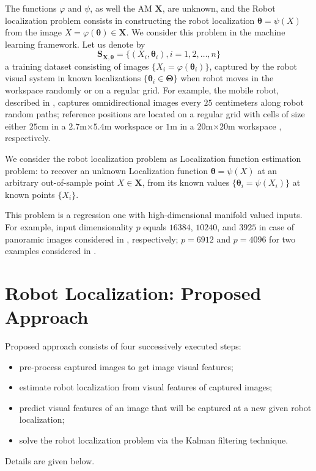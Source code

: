 \documentclass[conference]{IEEEtran} %
\def\mbTheta{{\bm\Theta}}
\def\mbtheta{{\bm\theta}}
\def\mbX{\mathbf{X}}
\def\mbS{\mathbf{S}}
\begin{document}
The functions $\varphi$ and $\psi$, as well the AM $\mbX$, are unknown, and the Robot localization problem consists in constructing the robot localization $\mbtheta = \psi(X)$ from the image $X = \varphi(\mbtheta) \in \mbX$. We consider this problem in the machine learning framework. Let us denote by
\begin{equation}
\label{eq3}
	\mbS_{\mathbf{X},\mbtheta} = \{(X_i,\mbtheta_i), i = 1, 2, \ldots, n\}
\end{equation}
a training dataset consisting of images $\{X_i = \varphi(\mbtheta_i)\}$, captured by the robot visual system in known localizations $\{\mbtheta_i \in \mbTheta\}$ when robot moves in the workspace randomly or on a regular grid. For example, the mobile robot, described in \cite{bib7}, captures omnidirectional images every $25$ centimeters along robot random paths; reference positions are located on a regular grid with cells of size either $25$cm in a $2.7$m$\times5.4$m workspace \cite{bib8} or $1$m in a $20$m$\times20$m workspace \cite{bib9}, respectively.

We consider the robot localization problem as Localization function estimation problem: to recover an unknown Localization function $\mbtheta = \psi(X)$ at an arbitrary out-of-sample point $X \in \mbX$, from its known values $\{\mbtheta_i = \psi(X_i)\}$ at known points $\{X_i\}$.

This problem is a regression one with high-dimensional manifold valued inputs. For example, input dimensionality $p$ equals $16384$, $10240$, and $3925$ in case of panoramic images considered in \cite{bib7,bib8,bib9}, respectively; $p = 6912$ and $p = 4096$ for two examples considered in \cite{bib10}.

\section{Robot Localization: Proposed Approach}
\label{sec3}

Proposed approach consists of four successively executed steps:
\begin{itemize}
	\item
    	pre-process captured images to get image visual features;
     \item
     	estimate robot localization from visual features of captured images;
     \item
     	predict visual features of an image that will be captured at a new given robot localization;
     \item
     	solve the robot localization problem via the Kalman filtering technique.
\end{itemize}
Details are given below.
\end{document}
